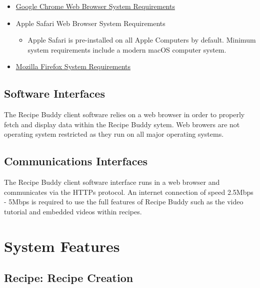 \documentclass{scrreprt}
\begin{document}
\begin{itemize}
    \item \href{https://support.google.com/chrome/a/answer/7100626?hl=en}{Google Chrome Web Browser System Requirements}
    \item Apple Safari Web Browser System Requirements
    \begin{itemize}
        \item Apple Safari is pre-installed on all Apple Computers by default. Minimum system requirements include a modern macOS computer system.
    \end{itemize}
    \item \href{https://www.mozilla.org/en-US/firefox/92.0.1/system-requirements/}{Mozilla Firefox System Requirements}
\end{itemize}

\section{Software Interfaces}
The Recipe Buddy client software relies on a web browser in order to properly fetch and display data within the Recipe Buddy sytem. Web browers are not operating system restricted as they run on all major operating systems.

\section{Communications Interfaces}
The Recipe Buddy client software interface runs in a web browser and communicates via the HTTPs protocol. An internet connection of speed 2.5Mbps - 5Mbps is required to use the full features of Recipe Buddy such as the video tutorial and embedded videos within recipes.

\chapter{System Features}

\section{Recipe: Recipe Creation}
\end{document}
